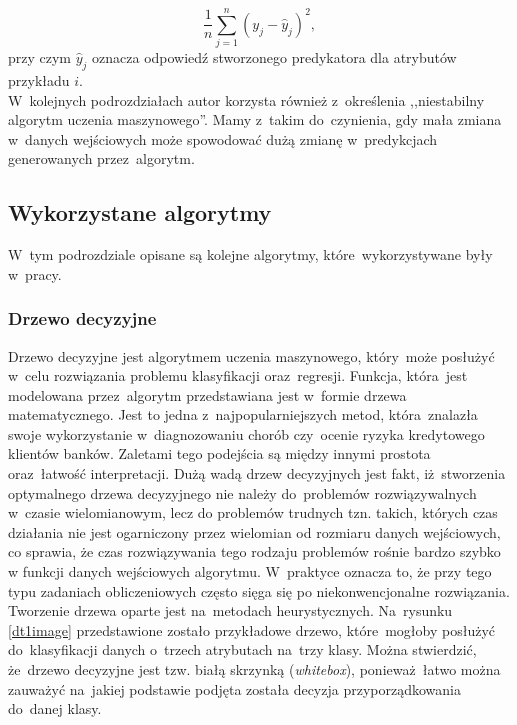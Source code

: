 \begin{equation}
\frac{1}{n} \sum_{j=1}^{n}(y_j - \hat{y}_j)^{2}, 
\end{equation}
przy czym $\hat{y}_j$ oznacza odpowiedź stworzonego predykatora dla atrybutów przykładu $i$.\\
W~kolejnych podrozdziałach autor korzysta również z~określenia ,,niestabilny algorytm uczenia maszynowego''. Mamy z~takim do~czynienia, gdy mała zmiana w~danych wejściowych może spowodować dużą zmianę w~predykcjach generowanych przez~algorytm\cite{ensemble}.

\subsection{Wykorzystane algorytmy}
W~tym podrozdziale opisane są kolejne algorytmy, które~wykorzystywane były w~pracy.
\subsubsection{Drzewo decyzyjne}
Drzewo decyzyjne jest algorytmem uczenia maszynowego, który~może posłużyć w~celu rozwiązania problemu klasyfikacji oraz~regresji. Funkcja, która~jest modelowana przez~algorytm przedstawiana jest w~formie drzewa matematycznego. Jest to jedna z~najpopularniejszych metod, która~znalazła swoje wykorzystanie w~diagnozowaniu chorób czy~ocenie ryzyka kredytowego klientów banków\cite{mitchel}. Zaletami tego podejścia są między innymi  prostota oraz~łatwość interpretacji. Dużą wadą drzew decyzyjnych jest fakt, iż~stworzenia optymalnego drzewa decyzyjnego nie należy do~problemów rozwiązywalnych w~czasie wielomianowym, lecz do problemów trudnych tzn. takich, których czas działania nie jest ogarniczony przez wielomian od rozmiaru danych wejściowych, co sprawia, że czas rozwiązywania tego rodzaju problemów rośnie bardzo szybko w funkcji danych wejściowych algorytmu. W~praktyce oznacza to, że przy tego typu zadaniach obliczeniowych często sięga się po niekonwencjonalne rozwiązania. Tworzenie drzewa oparte jest na~metodach heurystycznych\cite{dtscikit}. Na~rysunku \ref{dt1image} przedstawione zostało przykładowe drzewo, które~mogłoby posłużyć do~klasyfikacji danych o~trzech atrybutach na~trzy klasy. Można stwierdzić, że~drzewo decyzyjne jest tzw. białą skrzynką (\textit{whitebox}), ponieważ~łatwo można zauważyć na~jakiej podstawie podjęta została decyzja przyporządkowania do~danej klasy.

